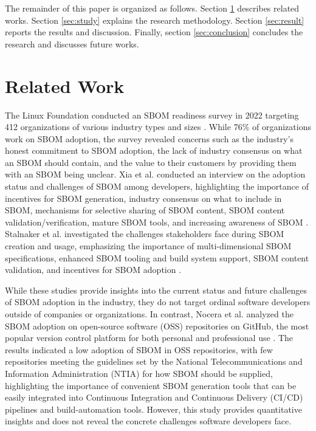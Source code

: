 \documentclass[conference]{IEEEtran}
\begin{document}
The remainder of this paper is organized as follows. Section \ref{sec:related} describes related works. Section \ref{sec:study} explains the research methodology. Section \ref{sec:result} reports the results and discussion. Finally, section \ref{sec:conclusion} concludes the research and discusses future works.

\section{Related Work}
\label{sec:related}

The Linux Foundation conducted an SBOM readiness survey in 2022 targeting 412 organizations of various industry types and sizes \cite{linux-foundation-readiness}. While 76\% of organizations work on SBOM adoption, the survey revealed concerns such as the industry's honest commitment to SBOM adoption, the lack of industry consensus on what an SBOM should contain, and the value to their customers by providing them with an SBOM being unclear. Xia et al. conducted an interview on the adoption status and challenges of SBOM among developers, highlighting the importance of incentives for SBOM generation, industry consensus on what to include in SBOM, mechanisms for selective sharing of SBOM content, SBOM content validation/verification, mature SBOM tools, and increasing awareness of SBOM \cite{sbom-study}. Stalnaker et al. investigated the challenges stakeholders face during SBOM creation and usage, emphasizing the importance of multi-dimensional SBOM specifications, enhanced SBOM tooling and build system support, SBOM content validation, and incentives for SBOM adoption \cite{bomsaway-stakeholders-study}.

While these studies provide insights into the current status and future challenges of SBOM adoption in the industry, they do not target ordinal software developers outside of companies or organizations. In contrast, Nocera et al. analyzed the SBOM adoption on open-source software (OSS) repositories on GitHub, the most popular version control platform for both personal and professional use \cite{sbom-study-github}. The results indicated a low adoption of SBOM in OSS repositories, with few repositories meeting the guidelines set by the National Telecommunications and Information Administration (NTIA) for how SBOM should be supplied, highlighting the importance of convenient SBOM generation tools that can be easily integrated into Continuous Integration and Continuous Delivery (CI/CD) pipelines and build-automation tools. However, this study provides quantitative insights and does not reveal the concrete challenges software developers face.
\end{document}
